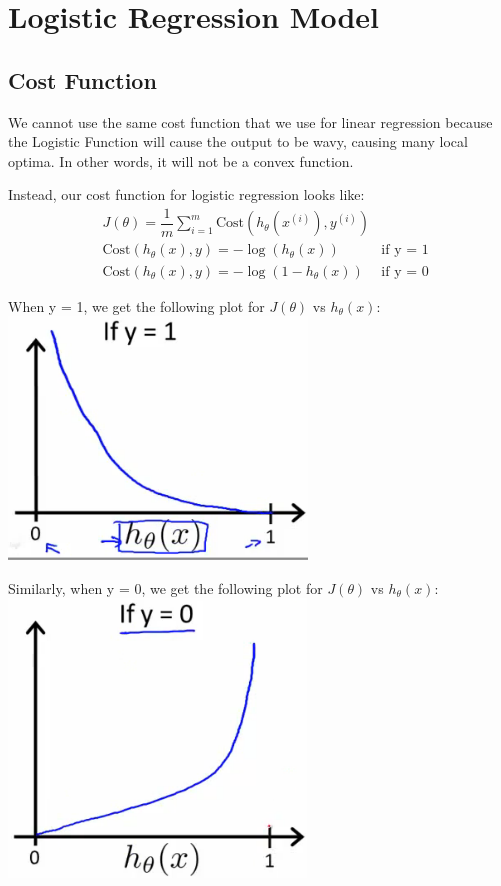 \documentclass{article}
\begin{document}
\section{Logistic Regression Model}
\subsection{Cost Function}
We cannot use the same cost function that we use for linear regression because the Logistic Function will cause the output to be wavy, causing many local optima. In other words, it will not be a convex function.

Instead, our cost function for logistic regression looks like:
\begin{align*}
	& J(\theta) = \dfrac{1}{m} \sum_{i=1}^m \mathrm{Cost}(h_\theta(x^{(i)}),y^{(i)}) \\ 
	& \mathrm{Cost}(h_\theta(x),y) = -\log(h_\theta(x)) \; & \text{if y = 1} \\
	& \mathrm{Cost}(h_\theta(x),y) = -\log(1-h_\theta(x)) \; & \text{if y = 0}
\end{align*}

When y = 1, we get the following plot for $J(\theta)$ vs $h_\theta (x)$:\\
\includegraphics{Logistic_regression_cost_function_positive_class}

Similarly, when y = 0, we get the following plot for $J(\theta)$ vs $h_\theta (x)$:\\
\includegraphics{Logistic_regression_cost_function_negative_class}
\end{document}
